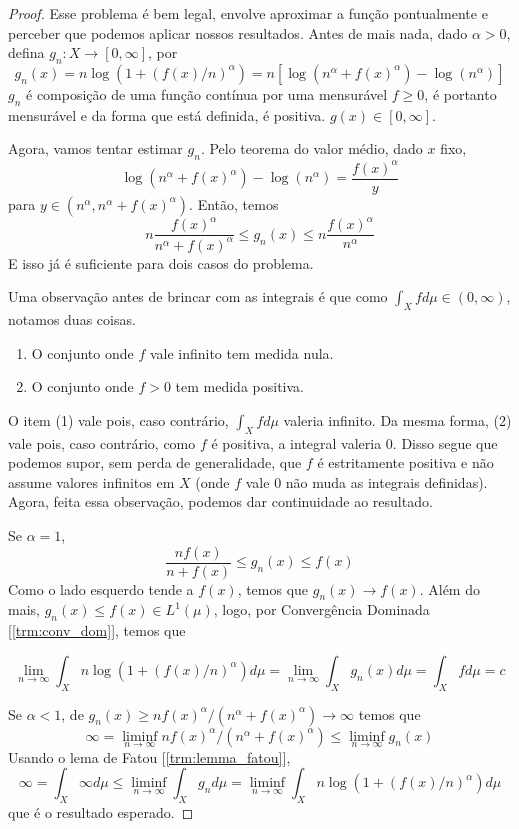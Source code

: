 \begin{problem}
    \label{prob:l2:3}
\end{problem}
\begin{proof}
    

    Esse problema é bem legal, envolve aproximar a função pontualmente e perceber que podemos aplicar nossos resultados. Antes de mais nada, dado $\alpha > 0$, defina $g_n : X \to [0,\infty]$, por 
    $$g_n(x) =n\log(1 + (f(x)/n)^\alpha) = n [\log(n^\alpha + f(x)^\alpha) - \log(n^\alpha)]$$
    $g_n$ é composição de uma função contínua por uma mensurável $f \geq 0$, é portanto mensurável e
    da forma que está definida, é positiva. $g(x) \in [0,\infty]$.

    Agora, vamos tentar estimar $g_n$. Pelo teorema do valor médio, dado $x$ fixo,
    $$\log(n^\alpha + f(x)^\alpha) - \log(n^\alpha) = \frac{f(x)^\alpha}{y}$$
    para $y \in (n^\alpha, n^\alpha + f(x)^\alpha)$.
    Então, temos
    $$n\frac{f(x)^\alpha}{n^\alpha + f(x)^\alpha} \leq g_n(x) \leq n\frac{f(x)^\alpha}{n^\alpha}$$
    E isso já é suficiente para dois casos do problema.
  
    Uma observação antes de brincar com as integrais é que como $\int_X f d\mu \in (0,\infty)$, notamos duas coisas. 
    \begin{enumerate}
        \item  O conjunto onde $f$ vale infinito tem medida nula.
        \item O conjunto onde $f > 0$ tem medida positiva.
    \end{enumerate}
    O item (1) vale pois, caso contrário, $\int_X fd\mu$ valeria infinito. Da mesma forma, (2) vale pois, caso contrário,
    como $f$ é positiva, a integral valeria $0$. Disso segue que podemos supor, sem perda de generalidade, que $f$ é estritamente 
    positiva e não assume valores infinitos em $X$ (onde $f$ vale $0$ não muda as integrais definidas). Agora, feita essa observação, 
    podemos dar continuidade ao resultado.

    
    Se $\alpha = 1$,
    $$\frac{nf(x)}{n + f(x)} \leq g_n(x) \leq f(x)$$
    Como o lado esquerdo tende a $f(x)$, temos que $g_n(x) \to f(x)$. Além do mais, $g_n(x) \leq f(x) \in L^1(\mu)$, logo, por Convergência Dominada [\ref{trm:conv_dom}], temos que
    
    $$\lim_{n\to\infty}\int_X n\log(1 + (f(x)/n)^\alpha)d\mu = \lim_{n\to\infty}\int_X g_n(x)d\mu = \int_X fd\mu = c$$
    
    Se $\alpha < 1$, de $g_n(x) \geq nf(x)^\alpha / (n^\alpha + f(x)^\alpha) \to \infty$
    temos que
    $$ \infty = \liminf_{n\to\infty} nf(x)^\alpha / (n^\alpha + f(x)^\alpha) \leq \liminf_{n\to\infty} g_n(x)$$
    Usando o lema de Fatou [\ref{trm:lemma_fatou}], 
    $$\infty = \int_X \infty d\mu \leq \liminf_{n\to\infty}\int_X g_n d\mu = \liminf_{n \to \infty} \int_X n\log(1 + (f(x)/n)^\alpha) d\mu$$
    que é o resultado esperado.
    

\end{proof}

